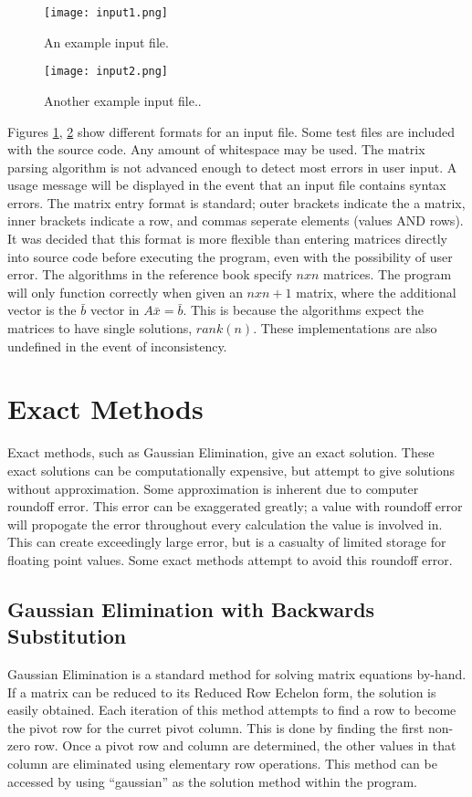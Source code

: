 \documentclass[12pt]{article}
\begin{document}
\begin{figure}[H]
\texttt{[image: input1.png]}
\caption{An example input file.}
\label{input1}
\end{figure}
\begin{figure}[H]
\texttt{[image: input2.png]}
\caption{Another example input file..}
\label{input2}
\end{figure}

Figures \ref{input1}, \ref{input2} show different formats for an input file. Some
test files are included with the source code. Any amount of whitespace may be used.
The matrix parsing algorithm is not advanced enough to detect most errors in user
input. A usage message will be displayed in the event that an input file contains
syntax errors. The matrix entry format is standard; outer brackets indicate the 
a matrix, inner brackets indicate a row, and commas seperate elements 
(values AND rows).  It was decided that this format is more flexible than entering
matrices directly into source code before executing the program, even with the
possibility of user error. The algorithms in the reference book specify $n x n$ 
matrices. The program will only function correctly when given an $n x n + 1$ 
matrix, where the additional vector is the $\bar{b}$ vector in $A\bar{x} = \bar{b}$.
This is because the algorithms expect the matrices to have single solutions,
$rank(n)$.
These implementations are also undefined in the event of inconsistency.

\section{Exact Methods}

Exact methods, such as Gaussian Elimination, give an exact solution. These 
exact solutions can be computationally expensive, but attempt to give solutions
without approximation. Some approximation is inherent due to computer roundoff
error. This error can be exaggerated greatly; a value with roundoff error 
will propogate the error throughout every calculation the value is involved in.
This can create exceedingly large error, but is a casualty of limited storage 
for floating point values. Some exact methods attempt to avoid this roundoff 
error.

\subsection{Gaussian Elimination with Backwards Substitution}
Gaussian Elimination is a standard method for solving matrix equations by-hand. If a 
matrix can be reduced to its Reduced Row Echelon form, the solution is easily
obtained. Each iteration of this method attempts to find a row to become the 
pivot row for the curret pivot column. This is done by finding the first non-zero
row. Once a pivot row and column are determined, the other values in that column
are eliminated using elementary row operations. 
This method can be accessed by using ``gaussian'' as the solution method
within the program.
\end{document}
